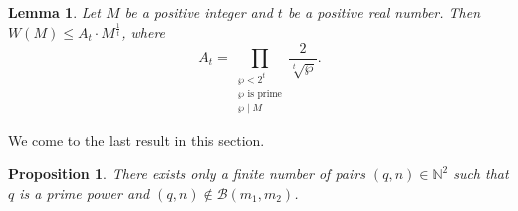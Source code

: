 \documentclass[12pt]{article}
\newtheorem{lemma}[theorem]{Lemma}
\newtheorem{proposition}[theorem]{Proposition}
\newcommand{\N}{\mathbb{N}}
\def\Bb {\mathcal{B}}
\begin{document}
\begin{lemma}\label{cota-t}
	Let $M$ be a positive integer and $t$ be a positive real number.
	Then
	$W(M)
	\leq A_t \cdot M^{\frac{1}{t}}$,
	where
	$$
	A_t=\prod_{\substack{\wp < 2^t \\ \wp \text{ is prime}
	                  \\ \wp \mid M}}
	\frac{2}{\sqrt[t]{\wp}}.
	$$
\end{lemma}
We come to the  last result in this section.

\begin{proposition}\label{Asymptotic}
	There exists only a finite number
	of pairs $(q,n) \in \N^2$ such that $q$ is a prime power and
	$(q,n) \notin \Bb(m_1,m_2)$.
\end{proposition}
\end{document}
